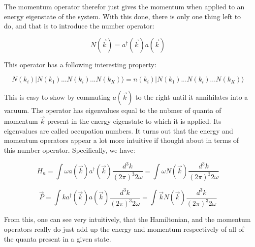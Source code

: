 \documentclass{article}
\begin{document}
    The momentum operator therefor just gives the momentum when applied to an energy eigenstate of the system.
    With this done, there is only one thing left to do, and that is to introduce the number operator:

    \begin{equation}
        N (\vec{k}) = a^{\dag} (\vec{k}) a (\vec{k})
    \end{equation}

    This operator has a following interesting property:

    \begin{equation}
        N (k_i) | N (k_1)...N (k_i)...N (k_K) \rangle = n (k_i) | N (k_1)...N (k_i)...N (k_K) \rangle
    \end{equation}

    This is easy to show by commuting $a (\vec{k})$ to the right until it annihilates into a vacuum. The operator
    has eigenvalues equal to the nubmer of quanta of momentum $\vec{k}$ present in the energy eigenstate to which
    it is applied. Its eigenvalues are called occupation numbers. It turns out that the energy and momentum 
    operators appear a lot more intuitive if thought about in terms of this number operator. Specifically, we have:

    \begin{equation}
        H_{n} = \int \omega a(\vec{k}) a^{\dag}(\vec{k}) \frac{d^{3} k}{(2 \pi)^{3} 2 \omega} = \int \omega N(\vec{k}) \frac{d^{3} k}{(2 \pi)^{3} 2 \omega}
    \end{equation}

    \begin{equation}
        \vec{P} = \int k a^{\dag}(\vec{k}) a(\vec{k}) \frac{d^{3} k}{(2 \pi)^{3} 2 \omega} = \int \vec{k} N(\vec{k}) \frac{d^{3} k}{(2 \pi)^{3} 2 \omega}
    \end{equation}

    From this, one can see very intuitively, that the Hamiltonian, and the momentum operators really do just add up
    the energy and momentum respectively of all of the quanta present in a given state.
\end{document}
